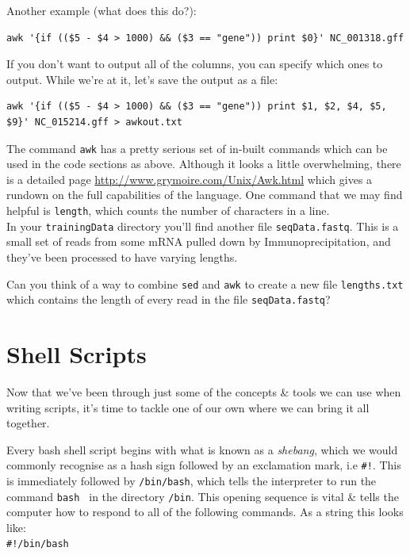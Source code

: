 \documentclass[a4paper,12pt,twoside]{memoir}
\begin{document}
\begin{steps}
Another example (what does this do?): \\
\begin{lstlisting}
awk '{if (($5 - $4 > 1000) && ($3 == "gene")) print $0}' NC_001318.gff 
\end{lstlisting}
If you don't want to output all of the columns, you can specify which ones to output.  
While we're at it, let's save the output as a file: \\
\begin{lstlisting}
awk '{if (($5 - $4 > 1000) && ($3 == "gene")) print $1, $2, $4, $5, $9}' NC_015214.gff > awkout.txt
\end{lstlisting}
\end{steps}

\begin{advanced}
The command \texttt{awk} has a pretty serious set of in-built commands which can be used in the code sections as above.
Although it looks a little overwhelming, there is a detailed page \url{http://www.grymoire.com/Unix/Awk.html} which gives a rundown on the full capabilities of the language.
One command that we may find helpful is \texttt{length}, which counts the number of characters in a line. \\

In your \texttt{trainingData} directory you'll find another file \texttt{seqData.fastq}.
This is a small set of reads from some mRNA pulled down by Immunoprecipitation, and they've been processed to have varying lengths.

\begin{questions}
Can you think of a way to combine \texttt{sed} and \texttt{awk} to create a new file \texttt{lengths.txt} which contains the length of every read in the file \texttt{seqData.fastq}?
\end{questions}
\begin{answer}}
\texttt{sed -n `2\~{}4p' seqData.fastq | awk `\{print length(\$1)\}' > lengths.txt}
\end{answer}
\end{advanced}


\section{Shell Scripts}
Now that we've been through just some of the concepts \& tools we can use when writing scripts, it's time to tackle one of our own where we can bring it all together.

\begin{information}
Every bash shell script begins with what is known as a \textit{shebang}, which we would commonly recognise as a hash sign followed by an exclamation mark, i.e \texttt{\#!}.
This is immediately followed by \texttt{/bin/bash}, which tells the interpreter to run the command \texttt{bash } in the directory \texttt{/bin}.
This opening sequence is vital \& tells the computer how to respond to all of the following commands.
As a string this looks like:\\

\texttt{\#!/bin/bash}\\
\end{information}
\end{document}
